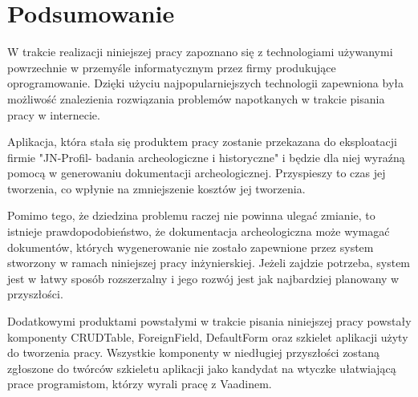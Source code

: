 \chapter{Podsumowanie}
W trakcie realizacji niniejszej pracy zapoznano się z technologiami używanymi powrzechnie w przemyśle informatycznym przez firmy produkujące oprogramowanie. Dzięki użyciu najpopularniejszych technologii zapewniona była możliwość znalezienia rozwiązania problemów napotkanych w trakcie pisania pracy w internecie.

Aplikacja, która stała się produktem pracy zostanie przekazana do eksploatacji firmie "JN-Profil- badania archeologiczne i historyczne" i będzie dla niej wyraźną pomocą w generowaniu dokumentacji archeologicznej. Przyspieszy to czas jej tworzenia, co wpłynie na zmniejszenie kosztów jej tworzenia. 

Pomimo tego, że dziedzina problemu raczej nie powinna ulegać zmianie, to istnieje prawdopodobieństwo, że dokumentacja archeologiczna może wymagać dokumentów, których wygenerowanie nie zostało zapewnione przez system stworzony w ramach niniejszej pracy inżynierskiej. Jeżeli zajdzie potrzeba, system jest w łatwy sposób rozszerzalny i jego rozwój jest jak najbardziej planowany w przyszłości.

Dodatkowymi produktami powstałymi w trakcie pisania niniejszej pracy powstały komponenty CRUDTable, ForeignField, DefaultForm oraz szkielet aplikacji użyty do tworzenia pracy. Wszystkie komponenty w niedługiej przyszłości zostaną zgłoszone do twórców szkieletu aplikacji jako kandydat na wtyczke ułatwiającą prace programistom, którzy wyrali pracę z Vaadinem.
